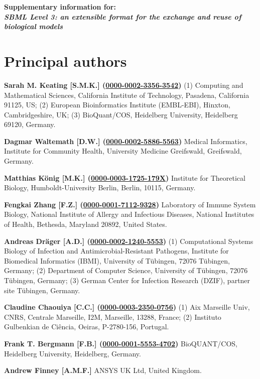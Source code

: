 \documentclass{sbml-paper}
\newcommand{\orcid}[1]{\href{https://orcid.org/#1}{#1}}
\begin{document}
\begin{center}\large\bfseries
Supplementary information for:\\
\emph{SBML Level 3: an extensible format for the exchange and reuse of biological models}
\end{center}

\vspace*{0.25in}

\section{Principal authors}

\textbf{Sarah M. Keating [S.M.K.] (\orcid{0000-0002-3356-3542})} (1) Computing and Mathematical Sciences, California Institute of Technology, Pasadena, California 91125, US; (2) European Bioinformatics Institute (EMBL-EBI), Hinxton, Cambridgeshire, UK; (3) BioQuant/COS, Heidelberg University, Heidelberg 69120, Germany.

\textbf{Dagmar Waltemath [D.W.] (\orcid{0000-0002-5886-5563})} Medical Informatics, Institute for Community Health, University Medicine Greifswald, Greifswald, Germany.

\textbf{Matthias K\"{o}nig [M.K.] (\orcid{0000-0003-1725-179X})} Institute for Theoretical Biology, Humboldt-University Berlin, Berlin, 10115, Germany.

\textbf{Fengkai Zhang [F.Z.] (\orcid{0000-0001-7112-9328})} Laboratory of Immune System Biology, National Institute of Allergy and Infectious Diseases, National Institutes of Health, Bethesda, Maryland 20892, United States.

\textbf{Andreas Dräger [A.D.] (\orcid{0000-0002-1240-5553})} (1) Computational Systems Biology of Infection and Antimicrobial-Resistant Pathogens, Institute for Biomedical Informatics (IBMI), University of Tübingen, 72076 Tübingen, Germany; (2) Department of Computer Science, University of Tübingen, 72076 Tübingen, Germany; (3) German Center for Infection Research (DZIF), partner site Tübingen, Germany.

\textbf{Claudine Chaouiya [C.C.] (\orcid{0000-0003-2350-0756})} (1) Aix Marseille Univ, CNRS, Centrale Marseille, I2M, Marseille, 13288, France; (2) Instituto Gulbenkian de Ciência, Oeiras, P-2780-156, Portugal.

\textbf{Frank T. Bergmann [F.B.] (\orcid{0000-0001-5553-4702})} BioQUANT/COS, Heidelberg University, Heidelberg, Germany.

\textbf{Andrew Finney [A.M.F.]} ANSYS UK Ltd, United Kingdom.
	
\end{document}
